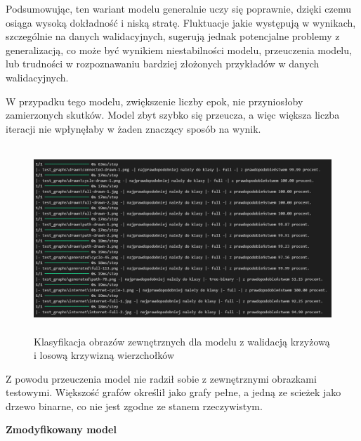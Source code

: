Podsumowując, ten wariant modelu generalnie uczy się poprawnie, dzięki czemu osiąga wysoką dokładność i niską stratę.
Fluktuacje jakie występują w wynikach, szczególnie na danych walidacyjnych,
sugerują jednak potencjalne problemy z generalizacją, co może być wynikiem niestabilności modelu,
przeuczenia modelu, lub trudności w rozpoznawaniu bardziej złożonych przykładów w danych walidacyjnych.

W przypadku tego modelu, zwiększenie liczby epok, nie przyniosłoby zamierzonych skutków.
Model zbyt szybko się przeucza, a więc większa liczba iteracji nie wpłynęłaby w żaden znaczący sposób na wynik.

\begin{figure}[ht]
	\centering
	\includegraphics[height=7cm]{resources/tests/images/v3/crossvalid_txt.png}
	\caption{Klasyfikacja obrazów zewnętrznych dla modelu z walidacją krzyżową i losową krzywizną wierzchołków}
	\label{Fig:tests-cv-2}
\end{figure}
\FloatBarrier

Z powodu przeuczenia model nie radził sobie z zewnętrznymi obrazkami testowymi.
Większość grafów określił jako grafy pełne, a jedną ze scieżek jako drzewo binarne,
co nie jest zgodne ze stanem rzeczywistym.

\textbf{Zmodyfikowany model}

